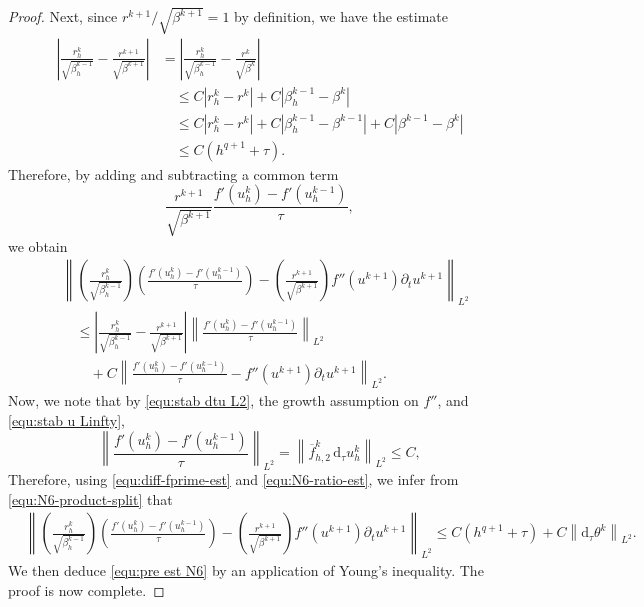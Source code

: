 \documentclass[10pt,a4paper]{amsart}
\newcommand{\abs}[1]{\left|{#1}\right|}
\newcommand{\dtt}{\mathrm{d}_\tau}
\newcommand{\norm}[2]{\left\|{#1}\right\|_{#2}}
\begin{document}
\begin{proof}
	Next, since $r^{k+1}/\sqrt{\beta^{k+1}}=1$ by definition, we have the estimate
	\begin{align}
		\abs{
			\frac{r_h^k}{\sqrt{\beta_h^{k-1}}}
			-
			\frac{r^{k+1}}{\sqrt{\beta^{k+1}}}
		}
		&
		=
		\abs{
			\frac{r_h^k}{\sqrt{\beta_h^{k-1}}}
			-
			\frac{r^k}{\sqrt{\beta^k}}
		}
		\nonumber\\
		&\quad
		\leq
		C\abs{r_h^k-r^k}
		+
		C\abs{\beta_h^{k-1}-\beta^k}
		\nonumber\\
		&\quad
		\leq
		C\abs{r_h^k-r^k}
		+
		C\abs{\beta_h^{k-1}-\beta^{k-1}}
		+
		C\abs{\beta^{k-1}-\beta^k}
		\nonumber\\
		&\quad
		\leq
		C(h^{q+1}+\tau).
		\label{equ:N6-ratio-est}
	\end{align}
	Therefore, by adding and subtracting a common term
	\[
	\frac{r^{k+1}}{\sqrt{\beta^{k+1}}}
	\frac{f'(u_h^k)-f'(u_h^{k-1})}{\tau},
	\]
	we obtain
	\begin{align}
		&\norm{
			\left(\frac{r_h^k}{\sqrt{\beta_h^{k-1}}}\right)
			\left(
			\frac{f'(u_h^k)-f'(u_h^{k-1})}{\tau}
			\right)
			-
			\left(
			\frac{r^{k+1}}{\sqrt{\beta^{k+1}}}
			\right)
			f''(u^{k+1})\partial_tu^{k+1}
		}{L^2}
		\nonumber\\
		&\quad
		\leq
		\abs{
			\frac{r_h^k}{\sqrt{\beta_h^{k-1}}}
			-
			\frac{r^{k+1}}{\sqrt{\beta^{k+1}}}
		}
		\norm{
			\frac{f'(u_h^k)-f'(u_h^{k-1})}{\tau}
		}{L^2}
		\nonumber\\
		&\qquad
		+
		C
		\norm{
			\frac{f'(u_h^k)-f'(u_h^{k-1})}{\tau}
			-
			f''(u^{k+1})\partial_tu^{k+1}
		}{L^2}.
		\label{equ:N6-product-split}
	\end{align}
	Now, we note that by \eqref{equ:stab dtu L2}, the growth assumption on $f''$, and \eqref{equ:stab u Linfty},
	\[
	\norm{
		\frac{f'(u_h^k)-f'(u_h^{k-1})}{\tau}
	}{L^2}
	=
	\norm{\overline f_{h,2}^k\, \dtt u_h^k}{L^2}
	\leq 
	C,
	\]
	Therefore, using \eqref{equ:diff-fprime-est} and \eqref{equ:N6-ratio-est}, we infer from \eqref{equ:N6-product-split} that
	\begin{align*}
		&\norm{
			\left(\frac{r_h^k}{\sqrt{\beta_h^{k-1}}}\right)
			\left(
			\frac{f'(u_h^k)-f'(u_h^{k-1})}{\tau}
			\right)
			-
			\left(
			\frac{r^{k+1}}{\sqrt{\beta^{k+1}}}
			\right)
			f''(u^{k+1})\partial_tu^{k+1}
		}{L^2}
		\leq
		C(h^{q+1}+\tau)
		+
		C\norm{\dtt\theta^k}{L^2}.
	\end{align*}
	We then deduce \eqref{equ:pre est N6} by an application of Young's inequality. The proof is now complete.
\end{proof}
\end{document}
